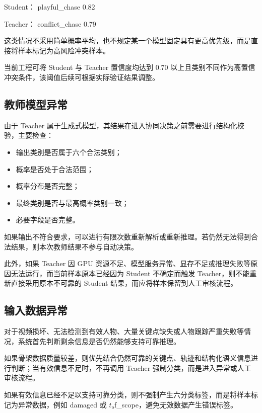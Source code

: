 \begin{NotionCode}
Student：
playful_chase     0.82

Teacher：
conflict_chase    0.79
\end{NotionCode}

这类情况不采用简单概率平均，也不规定某一个模型固定具有更高优先级，而是直接将样本标记为高风险冲突样本。

当前工程可将 Student 与 Teacher 置信度均达到 0.70 以上且类别不同作为高置信冲突条件，该阈值后续可根据实际验证结果调整。

\subsection{教师模型异常}

由于 Teacher 属于生成式模型，其结果在进入协同决策之前需要进行结构化校验，主要检查：

\begin{itemize}
\item 输出类别是否属于六个合法类别；
\item 概率是否处于合法范围；
\item 概率分布是否完整；
\item 最终类别是否与最高概率类别一致；
\item 必要字段是否完整。
\end{itemize}

如果输出不符合要求，可以进行有限次数重新解析或重新推理。若仍然无法得到合法结果，则本次教师结果不参与自动决策。

此外，如果 Teacher 因 GPU 资源不足、模型服务异常、显存不足或推理失败等原因无法运行，而当前样本原本已经因为 Student 不确定而触发 Teacher，则不能重新直接采用原本不可靠的 Student 结果，而应将样本保留到人工审核流程。

\subsection{输入数据异常}

对于视频损坏、无法检测到有效人物、大量关键点缺失或人物跟踪严重失败等情况，系统首先判断剩余信息是否仍然能够支持可靠推理。

如果骨架数据质量较差，则优先结合仍然可靠的关键点、轨迹和结构化语义信息进行判断；当有效信息不足时，不再调用 Teacher 强制分类，而是进入异常或人工审核流程。

如果有效信息已经不足以支持可靠分类，则不强制产生六分类标签，而是将样本标记为异常数据，例如 damaged 或 \(t_o\)f\_scope，避免无效数据产生错误标签。

